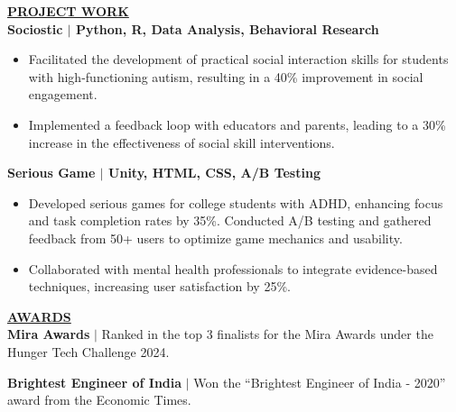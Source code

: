 \documentclass{article}
\begin{document}
\vspace{2mm}

\noindent \textbf{\underline{PROJECT WORK}} \\
\noindent \textbf{Sociostic $\mid$ Python, R, Data Analysis, Behavioral Research} 
\begin{itemize}[noitemsep,nolistsep,leftmargin=*]
    \item Facilitated the development of practical social interaction skills for students with high-functioning autism, resulting in a 40\% improvement in social engagement.
    \item Implemented a feedback loop with educators and parents, leading to a 30\% increase in the effectiveness of social skill interventions.
\end{itemize}

\noindent \textbf{Serious Game $\mid$ Unity, HTML, CSS, A/B Testing} 
\begin{itemize}[noitemsep,nolistsep,leftmargin=*]
    \item Developed serious games for college students with ADHD, enhancing focus and task completion rates by 35\%. Conducted A/B testing and gathered feedback from 50+ users to optimize game mechanics and usability.
    \item Collaborated with mental health professionals to integrate evidence-based techniques, increasing user satisfaction by 25\%.
\end{itemize}

\vspace{2mm}

\noindent \textbf{\underline{AWARDS}} \\
\noindent \textbf{Mira Awards} $\mid$ Ranked in the top 3 finalists for the Mira Awards under the Hunger Tech Challenge 2024.

\noindent \textbf{Brightest Engineer of India} $\mid$ Won the “Brightest Engineer of India - 2020” award from the Economic Times.

    
\end{document}

